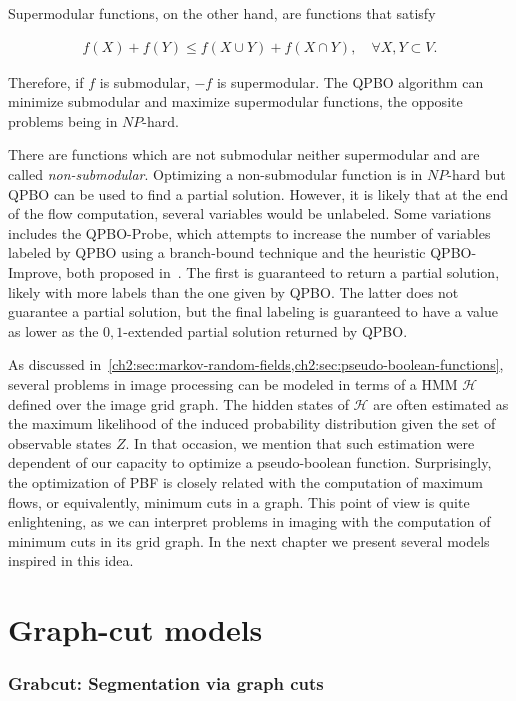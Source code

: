 Supermodular functions, on the other hand, are functions that satisfy

\begin{align*}
	f(X) + f(Y) \leq f(X \cup Y) + f(X \cap Y),\quad \forall X,Y \subset V.
\end{align*}

Therefore, if $f$ is submodular, $-f$ is supermodular. The QPBO algorithm can minimize submodular and maximize supermodular functions, the opposite problems being in $NP$-hard. 

There are functions which are not submodular neither supermodular and are called \emph{non-submodular}. Optimizing a non-submodular function is in $NP$-hard but QPBO can be used to find a partial solution. However, it is likely that at the end of the flow computation, several variables would be unlabeled. Some variations includes the QPBO-Probe, which attempts to increase the number of variables labeled by QPBO using a branch-bound technique and the heuristic QPBO-Improve, both proposed in~\cite{rother07qpbo}. The first is guaranteed to return a partial solution, likely with more labels than the one given by QPBO. The latter does not guarantee a partial solution, but the final labeling is guaranteed to have a value as lower as the $0,1$-extended partial solution returned by QPBO.

As discussed in~\cref{ch2:sec:markov-random-fields,ch2:sec:pseudo-boolean-functions}, several problems in image processing can be modeled in terms of a HMM $\mathcal{H}$ defined over the image grid graph. The hidden states of $\mathcal{H}$ are often estimated as the maximum likelihood of the induced probability distribution given the set of observable states $Z$. In that occasion, we mention that such estimation were dependent of our capacity to optimize a pseudo-boolean function. Surprisingly, the optimization of PBF is closely related with the computation of maximum flows, or equivalently, minimum cuts in a graph. This point of view is quite enlightening, as we can interpret problems in imaging with the computation of minimum cuts in its grid graph. In the next chapter we present several models inspired in this idea.



\section{Graph-cut models}
\label{ch2:sec:graph-cut-models}

\subsubsection{Grabcut: Segmentation via graph cuts}

